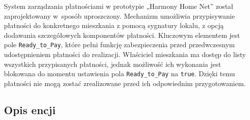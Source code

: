 System zarządzania płatnościami w prototypie „Harmony Home Net” został zaprojektowany w~sposób uproszczony. Mechanizm umożliwia przypisywanie płatności do konkretnego mieszkania z pomocą sygnatury lokalu, z opcją dodawania szczegółowych komponentów płatności. Kluczowym elementem jest pole \texttt{Ready\_to\_Pay}, które pełni funkcję zabezpieczenia przed przedwczesnym udostępnieniem płatności do realizacji. Właściciel mieszkania ma dostęp do listy wszystkich przypisanych płatności, jednak możliwość ich wykonania jest blokowana do momentu ustawienia pola \texttt{Ready\_to\_Pay} na \texttt{true}. Dzięki temu płatności nie mogą zostać zrealizowane przed ich odpowiednim przygotowaniem.

\subsection{Opis encji}

